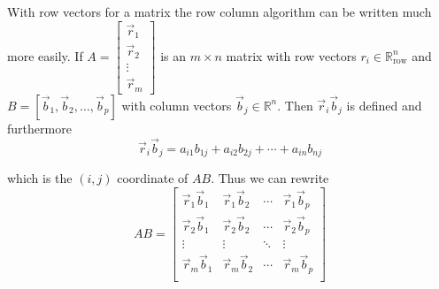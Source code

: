 \begin{remark} With row vectors for a matrix the row column algorithm can be written much more easily. If 
$A=\begin{bmatrix} \vec{r}_1 \\ \vec{r}_2 \\ \vdots \\ \vec{r}_m\end{bmatrix}$ is an $m \times n$ matrix with row vectors $r_i \in \mathbb{R}^n_\text{row}$ 
and $B=[\vec{b}_1, \vec{b}_2, \ldots, \vec{b}_p]$ with column vectors $\vec{b}_j \in \mathbb{R}^n$. Then $\vec{r}_i\vec{b}_j$ is defined and furthermore
\[
\vec{r}_i\vec{b}_j=a_{i1}b_{1j}+a_{i2}b_{2j}+\cdots+a_{in}b_{nj}
\]

which is the $(i,j)$ coordinate of $AB$. Thus we can rewrite 
\[
AB=\begin{bmatrix}
\vec{r}_1\vec{b}_1 & \vec{r}_1\vec{b}_2 & \cdots & \vec{r}_1\vec{b}_p \\
\vec{r}_2\vec{b}_1 & \vec{r}_2\vec{b}_2 & \cdots & \vec{r}_2\vec{b}_p \\
\vdots & \vdots & \ddots & \vdots \\
\vec{r}_m\vec{b}_1 & \vec{r}_m\vec{b}_2 & \cdots & \vec{r}_m\vec{b}_p \\
\end{bmatrix}
\]

\end{remark}

